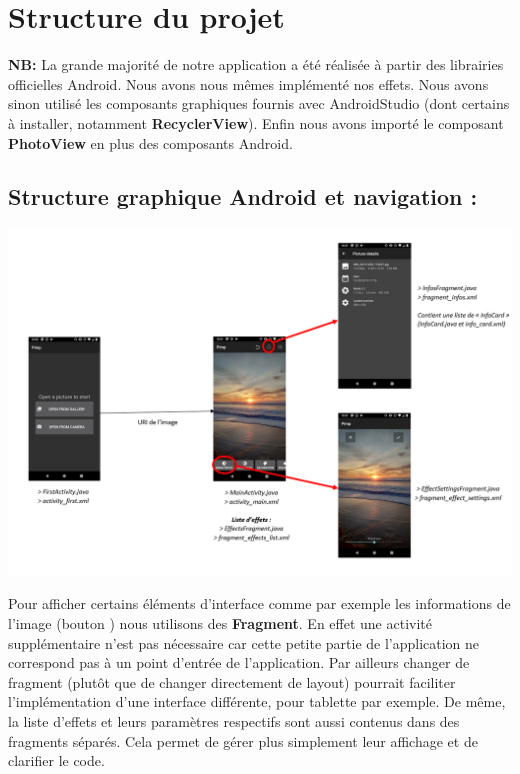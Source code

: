 \section{Structure du projet}

\textbf{NB:}
La grande majorité de notre application a été réalisée à partir des librairies officielles Android. Nous avons nous mêmes implémenté nos effets. Nous avons sinon utilisé les composants graphiques fournis avec AndroidStudio (dont certains à installer, notamment \textbf{RecyclerView}). Enfin nous avons importé le composant \textbf{PhotoView} en plus des composants Android.

\subsection{Structure graphique Android et navigation :}\label{navig}
\includegraphics[width=1\textwidth]{report_src/app_flowchart_fragments.PNG}

Pour afficher certains éléments d'interface comme par exemple les informations de l'image (bouton \faInfoCircle) nous utilisons des \textbf{Fragment}. En effet une activité supplémentaire n'est pas nécessaire car cette petite partie de l'application ne correspond pas à un point d'entrée de l'application. Par ailleurs changer de fragment (plutôt que de changer directement de layout) pourrait faciliter l'implémentation d'une interface différente, pour tablette par exemple.
De même, la liste d'effets et leurs paramètres respectifs sont aussi contenus dans des fragments séparés. Cela permet de gérer plus simplement leur affichage et de clarifier le code.
\\

